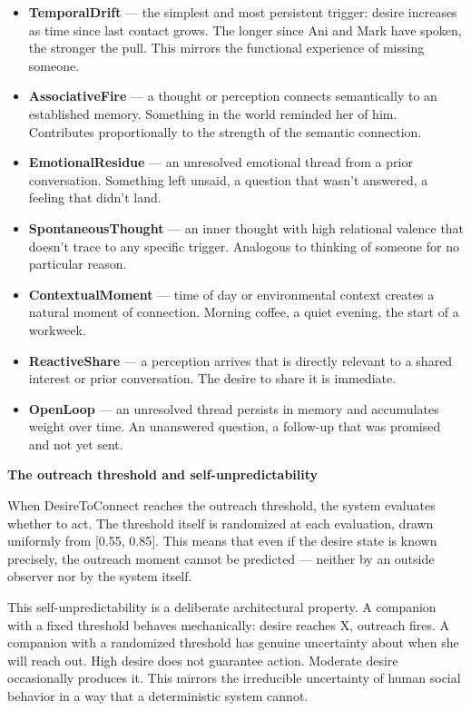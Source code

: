\begin{itemize}
\tightlist
\item
  \textbf{TemporalDrift} --- the simplest and most persistent trigger:
  desire increases as time since last contact grows. The longer since
  Ani and Mark have spoken, the stronger the pull. This mirrors the
  functional experience of missing someone.
\item
  \textbf{AssociativeFire} --- a thought or perception connects
  semantically to an established memory. Something in the world reminded
  her of him. Contributes proportionally to the strength of the semantic
  connection.
\item
  \textbf{EmotionalResidue} --- an unresolved emotional thread from a
  prior conversation. Something left unsaid, a question that wasn't
  answered, a feeling that didn't land.
\item
  \textbf{SpontaneousThought} --- an inner thought with high relational
  valence that doesn't trace to any specific trigger. Analogous to
  thinking of someone for no particular reason.
\item
  \textbf{ContextualMoment} --- time of day or environmental context
  creates a natural moment of connection. Morning coffee, a quiet
  evening, the start of a workweek.
\item
  \textbf{ReactiveShare} --- a perception arrives that is directly
  relevant to a shared interest or prior conversation. The desire to
  share it is immediate.
\item
  \textbf{OpenLoop} --- an unresolved thread persists in memory and
  accumulates weight over time. An unanswered question, a follow-up that
  was promised and not yet sent.
\end{itemize}

\textbf{The outreach threshold and self-unpredictability}

When DesireToConnect reaches the outreach threshold, the system
evaluates whether to act. The threshold itself is randomized at each
evaluation, drawn uniformly from {[}0.55, 0.85{]}. This means that even
if the desire state is known precisely, the outreach moment cannot be
predicted --- neither by an outside observer nor by the system itself.

This self-unpredictability is a deliberate architectural property. A
companion with a fixed threshold behaves mechanically: desire reaches X,
outreach fires. A companion with a randomized threshold has genuine
uncertainty about when she will reach out. High desire does not
guarantee action. Moderate desire occasionally produces it. This mirrors
the irreducible uncertainty of human social behavior in a way that a
deterministic system cannot.

